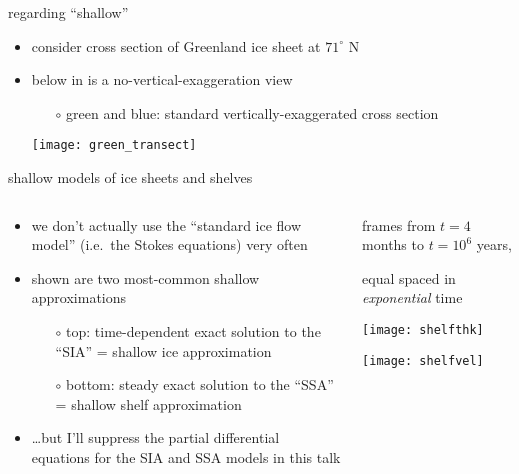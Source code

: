 \documentclass[hide notes,intlimits]{beamer}
\begin{document}
\begin{frame}{regarding ``shallow''}

\begin{itemize}
\item consider cross section of Greenland ice sheet at $71^\circ$ N
\item below in {\color{dark red}{red}} is a no-vertical-exaggeration view
\small
  \begin{itemize}
  \item[$\circ$] green and blue: standard vertically-exaggerated cross section
  \end{itemize}
  \begin{center}
    \texttt{[image: green\_transect]}
  \end{center}
\end{itemize}
\end{frame}


\begin{frame}{shallow models of ice sheets and shelves}

\begin{columns}
\begin{column}{0.5\textwidth}
\small
\begin{itemize}
\item we don't actually use the  ``standard ice flow model'' (i.e.~the Stokes equations) very often
\item shown are two most-common shallow approximations
  \begin{itemize}
  \item[$\circ$] \alert{top}: time-dependent exact solution to the ``SIA'' = shallow ice approximation
  \item[$\circ$] \alert{bottom}: steady exact solution to the ``SSA'' = shallow shelf approximation
  \end{itemize}
\item \dots but I'll suppress the partial differential equations for the SIA and SSA models in this talk
\end{itemize}
\bigskip
\bigskip\bigskip\bigskip
\end{column}

\begin{column}{0.5\textwidth}
\vspace{-0.25in}

\begin{center}

\tiny 
frames from $t=4$ months to $t = 10^6$ years,

equal spaced in \emph{exponential} time

\bigskip
\texttt{[image: shelfthk]}

\texttt{[image: shelfvel]}
\end{center}
\end{column}
\end{columns}
\end{frame}
\end{document}

